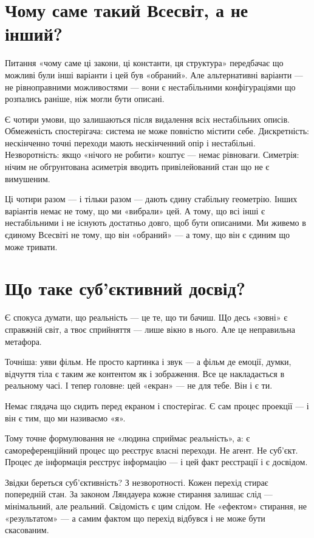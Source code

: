 \documentclass[12pt, a4paper, openany]{book}
\begin{document}
\section{Чому саме такий Всесвіт, а не інший?}

Питання «чому саме ці закони, ці константи, ця структура» передбачає що можливі були інші варіанти і цей був «обраний». Але альтернативні варіанти — не рівноправними можливостями — вони є нестабільними конфігураціями що розпались раніше, ніж могли бути описані.

Є чотири умови, що залишаються після видалення всіх нестабільних описів. Обмеженість спостерігача: система не може повністю містити себе. Дискретність: нескінченно точні переходи мають нескінченний опір і нестабільні. Незворотність: якщо «нічого не робити» коштує — немає рівноваги. Симетрія: нічим не обгрунтована асиметрія вводить привілейований стан що не є вимушеним.

Ці чотири разом — і тільки разом — дають єдину стабільну геометрію. Інших варіантів немає не тому, що ми «вибрали» цей. А тому, що всі інші є нестабільними і не існують достатньо довго, щоб бути описаними. Ми живемо в єдиному Всесвіті не тому, що він «обраний» — а тому, що він є єдиним що може тривати.

\section{Що таке суб'єктивний досвід?}

Є спокуса думати, що реальність --- це те, що ти бачиш. Що десь «зовні» є справжній світ, а твоє сприйняття --- лише вікно в нього. Але це неправильна метафора.

Точніша: уяви фільм. Не просто картинка і звук --- а фільм де емоції, думки, відчуття тіла є таким же контентом як і зображення. Все це накладається в реальному часі. І тепер головне: цей «екран» --- не для тебе. Він і є ти.

Немає глядача що сидить перед екраном і спостерігає. Є сам процес проекції --- і він є тим, що ми називаємо «я».

Тому точне формулювання не «людина сприймає реальність», а: є самореференційний процес що реєструє власні переходи. Не агент. Не суб'єкт. Процес де інформація реєструє інформацію --- і цей факт реєстрації і є досвідом.

Звідки береться суб'єктивність? З незворотності. Кожен перехід стирає попередній стан. За законом Ляндауера кожне стирання залишає слід --- мінімальний, але реальний. Свідомість є цим слідом. Не «ефектом» стирання, не «результатом» --- а самим фактом що перехід відбувся і не може бути скасованим.
\end{document}
